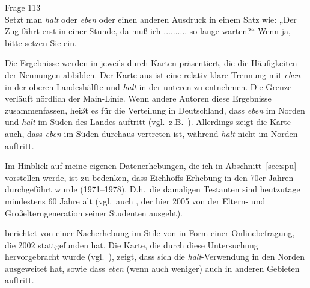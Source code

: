\begin{exe}
	\ex\label{538} Frage 113\\
    Setzt man \textit{halt} oder \textit{eben} oder einen anderen Ausdruck in einem Satz wie: „Der Zug fährt erst in einer Stunde, da muß ich .......... so lange warten?“ Wenn ja, bitte setzen Sie ein.
\hfill\hbox{\citet[31]{Eichhoff1978}}    
\end{exe}
Die Ergebnisse werden in \citet{Eichhoff1978} jeweils durch Karten präsentiert, die die Häufigkeiten der Nennungen abbilden.
Der Karte aus \citet[103]{Eichhoff1978} ist eine relativ klare Trennung mit \textit{eben} in der oberen Landeshälfte und \textit{halt} in der unteren zu entnehmen. Die Grenze verläuft nördlich der Main-Linie. Wenn andere Autoren diese Ergebnisse zusammenfassen, heißt es für die Verteilung in Deutschland, dass \textit{eben} im Norden und \textit{halt} im Süden des Landes auftritt (vgl.\ z.B.\ \citealt[212]{Dittmar2000}). Allerdings zeigt die Karte auch, dass \textit{eben} im Süden durchaus vertreten ist, während \textit{halt} nicht im Norden auftritt.

Im Hinblick auf meine eigenen Datenerhebungen, die ich in Abschnitt~\ref{sec:spu} vorstellen werde, ist zu bedenken, dass Eichhoffs Erhebung in den 70er Jahren durchgeführt wurde (1971–1978). D.h.\ die damaligen Testanten sind heutzutage mindestens 60 Jahre alt (vgl.\ auch \citealt[2]{Elspass2005}, der hier 2005 von der Eltern- und Großelterngeneration seiner Studenten ausgeht). 

\citet{Elspass2005} berichtet von einer Nacherhebung im Stile von \citet{Eichhoff1978} in Form einer Onlinebefragung, die 2002 stattgefunden hat. %
Die Karte, die durch diese Untersuchung hervorgebracht wurde (vgl.\ \citealt[51]{Elspass2005}), zeigt, dass sich die \textit{halt}-Verwendung in den Norden ausgeweitet hat, sowie dass \textit{eben} (wenn auch weniger) auch in anderen Gebieten auftritt.

